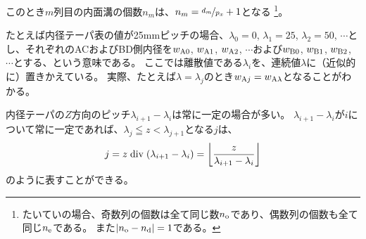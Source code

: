 このとき$m$列目の内面溝の個数$n_m$は、$n_m = \nicefrac{d_m}{p_x}+1$となる
\footnote{\label{fn:generallyDimpleN}
たいていの場合、奇数列の個数は全て同じ数$n_\text o$であり、偶数列の個数も全て同じ$n_\text e$である。
また$|n_\text o-n_\text d| = 1$である。}。
\begin{hosokubox}[label=hosoku:example4taper]
たとえば内径テーパ表の値が25mmピッチの場合、$\lambda_0=0$, $\lambda_1=25$, $\lambda_2=50$, $\cdots$とし、それぞれのACおよびBD側内径を$w_{\text A0}$, $w_{\text A1}$, $w_{\text A2}$, $\cdots$および$w_{\text B0}$, $w_{\text B1}$, $w_{\text B2}$, $\cdots$とする、という意味である。
ここでは離散値である$\lambda_i$を、連続値$\lambda$に（近似的に）置きかえている。
実際、たとえば$\lambda = \lambda_j$のとき$w_{\text Aj} = w_{\text A\lambda}$となることがわかる。
\end{hosokubox}\relax
\begin{hosokubox}
内径テーパの$Z$方向のピッチ$\lambda_{i+1}-\lambda_i$は常に一定の場合が多い。
$\lambda_{i+1}-\lambda_i$が$i$について常に一定であれば、$\lambda_j \leqq z < \lambda_{j+1}$となる$j$は、
\begin{align*}
  j = z \bDiv (\lambda_{i+1}-\lambda_i) = \left\lfloor\frac z{\lambda_{i+1}-\lambda_i}\right\rfloor
\end{align*}
のように表すことができる。
\end{hosokubox}
